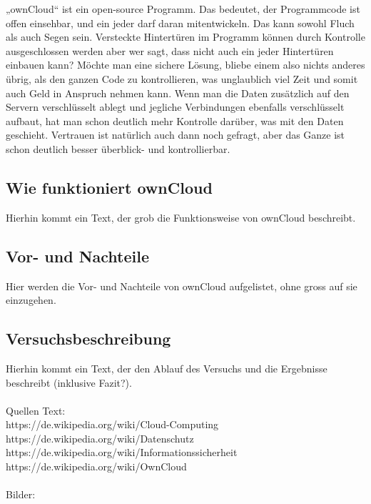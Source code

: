 „ownCloud“ ist ein open-source Programm. Das bedeutet, der Programmcode ist offen einsehbar, und ein jeder darf daran mitentwickeln. Das kann sowohl Fluch als auch Segen sein. Versteckte Hintertüren im Programm können durch Kontrolle ausgeschlossen werden aber wer sagt, dass nicht auch ein jeder Hintertüren einbauen kann? Möchte man eine sichere Lösung, bliebe einem also nichts anderes übrig, als den ganzen Code zu kontrollieren, was unglaublich viel Zeit und somit auch Geld in Anspruch nehmen kann. Wenn man die Daten zusätzlich auf den Servern verschlüsselt ablegt und jegliche Verbindungen ebenfalls verschlüsselt aufbaut, hat man schon deutlich mehr Kontrolle darüber, was mit den Daten geschieht. Vertrauen ist natürlich auch dann noch gefragt, aber das Ganze ist schon deutlich besser überblick- und kontrollierbar.

\subsection{Wie funktioniert ownCloud}
Hierhin kommt ein Text, der grob die Funktionsweise von ownCloud beschreibt.

\subsection{Vor- und Nachteile}
Hier werden die Vor- und Nachteile von ownCloud aufgelistet, ohne gross auf sie einzugehen.

\subsection{Versuchsbeschreibung}
Hierhin kommt ein Text, der den Ablauf des Versuchs und die Ergebnisse beschreibt (inklusive Fazit?).
\\
\\
Quellen Text:
\\https://de.wikipedia.org/wiki/Cloud-Computing
\\https://de.wikipedia.org/wiki/Datenschutz
\\https://de.wikipedia.org/wiki/Informationssicherheit
\\https://de.wikipedia.org/wiki/OwnCloud
\\
\\
Bilder:
